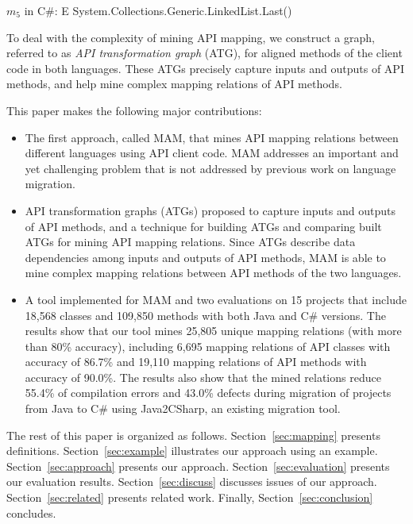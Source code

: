 \begin{CodeOut}
$m_5$ in C\#: E System.Collections.Generic.LinkedList.Last()
\end{CodeOut}

To deal with the complexity of mining API mapping, we construct a
graph, referred to as \emph{API transformation graph} (ATG), for
aligned methods of the client code in both languages. These ATGs
precisely capture inputs and outputs of API methods, and help mine
complex mapping relations of API methods.

This paper makes the following major contributions:

\begin{itemize}\vspace*{-1.5ex}
\item The first approach, called MAM, that mines API mapping relations between
different languages using API client code. MAM
addresses an important and yet challenging problem that is not
addressed by previous work on language migration.\vspace*{-1.5ex}
\item API transformation graphs (ATGs) proposed to capture inputs
and outputs of API methods, and a technique for building ATGs and
comparing built ATGs for mining API mapping relations. Since ATGs describe data
dependencies among inputs and outputs of API methods, MAM is able to
mine complex mapping relations between API methods of the two
languages.\vspace*{-1.5ex}
\item A tool implemented for MAM and two
evaluations on 15 projects that include 18,568 classes and 109,850
methods with both Java and C\# versions. The results show that our
tool mines 25,805 unique mapping relations (with more than 80\% accuracy), 
including 6,695 mapping relations of API classes with accuracy of
86.7\% and 19,110 mapping relations of API methods with accuracy of
90.0\%. The results also show that the mined relations
reduce 55.4\% of compilation errors and 43.0\% defects during
migration of projects from Java to C\# using Java2CSharp, an existing migration tool.
\end{itemize}\vspace*{-1.5ex}

The rest of this paper is organized as follows.
Section~\ref{sec:mapping} presents definitions.
Section~\ref{sec:example} illustrates our approach using an example.
Section~\ref{sec:approach} presents our approach.
Section~\ref{sec:evaluation} presents our evaluation results.
Section~\ref{sec:discuss} discusses issues of our approach.
Section~\ref{sec:related} presents related work.
Finally, Section~\ref{sec:conclusion} concludes.

